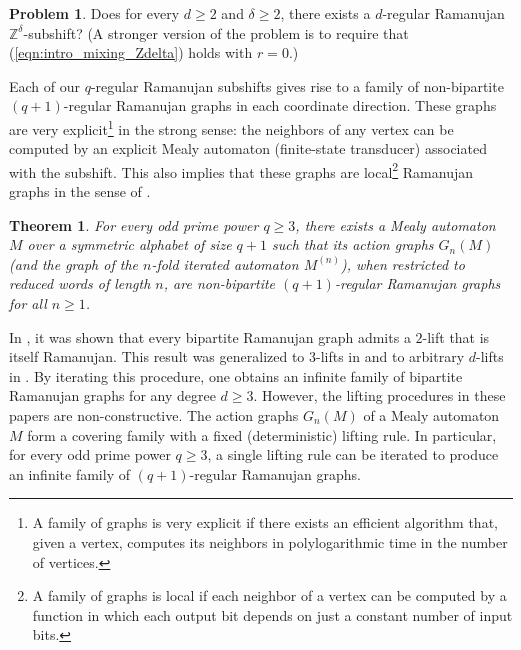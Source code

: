 \documentclass[12pt]{article}
\newtheorem{theorem}{Theorem}
\theoremstyle{definition}
\newtheorem{problem}{Problem}
\begin{document}
\begin{problem}
Does for every $d\geq 2$ and $\delta\geq 2$, there exists a $d$-regular Ramanujan $\mathbb{Z}^\delta$-subshift? (A stronger version of the problem is to require that (\ref{eqn:intro_mixing_Zdelta}) holds with $r=0$.)
\end{problem}

Each of our $q$-regular Ramanujan subshifts gives rise to a family of non-bipartite $(q+1)$-regular Ramanujan graphs in each coordinate direction. These graphs are very explicit\footnote{A family of graphs is very explicit if there exists an efficient algorithm that, given a vertex, computes its neighbors in polylogarithmic time in the number of vertices.} in the strong sense: the neighbors of any vertex can be computed by an explicit Mealy automaton (finite-state transducer) associated with the subshift.
This also implies that these graphs are local\footnote{A family of graphs is local if each neighbor of a vertex can be computed by a function in which each output bit depends on just a constant number of input bits.} Ramanujan graphs in the sense of \cite{ViolaWigderson2018,BatraSaxenaShringi2023}.

\begin{theorem}
For every odd prime power $q\geq 3$, there exists a Mealy automaton $M$ over a symmetric alphabet of size $q+1$ such that its action graphs $G_n(M)$ (and the graph of the $n$-fold iterated automaton $M^{(n)}$), when restricted to reduced words of length $n$, are non-bipartite $(q+1)$-regular Ramanujan graphs for all $n\geq 1$.
\end{theorem}

In \cite{MarcusSpielmanSrivastava2015}, it was shown that every bipartite Ramanujan graph admits a $2$-lift that is itself Ramanujan. This result was generalized to $3$-lifts in \cite{LiuPV} and to arbitrary $d$-lifts in \cite{Doron}. By iterating this procedure, one obtains an infinite family of bipartite Ramanujan graphs for any degree $d\geq 3$. However, the lifting procedures in these papers are non-constructive. The action graphs $G_n(M)$ of a Mealy automaton $M$ form a covering family with a fixed (deterministic) lifting rule. In particular, for every odd prime power $q\geq 3$, a single lifting rule can be iterated to produce an infinite family of $(q+1)$-regular Ramanujan graphs.


\end{document}
